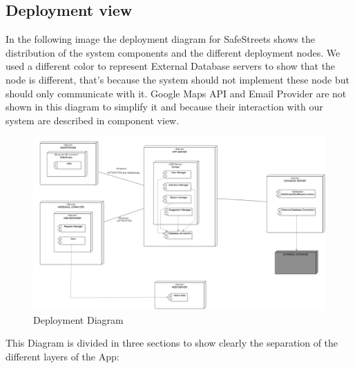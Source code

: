 \subsection{Deployment view}
In the following image the deployment diagram for SafeStreets shows the distribution of the system components and the different deployment nodes. We used a different color to represent External Database servers to show that the node is different, that's because the system should not implement these node but should only communicate with it.
Google Maps API and Email Provider are not shown in this diagram to simplify it and because their interaction with our system are described in component view.
\newline
\begin{figure}[H]
\centering
\includegraphics[width=\textwidth]{Images/Deployment.png}
\caption{\label{fig:ComWI} Deployment Diagram}
\end{figure}
This Diagram is divided in three sections to show clearly the separation of the different layers of the
App:
